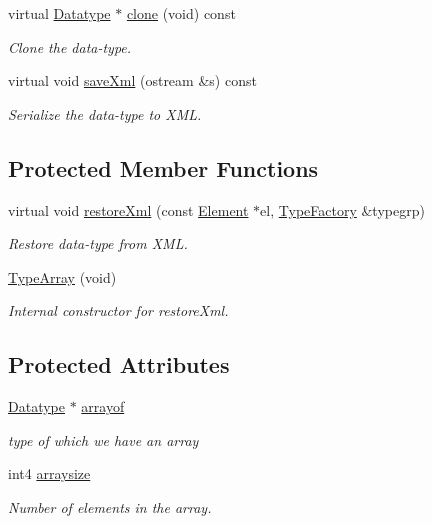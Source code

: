 \begin{DoxyCompactItemize}
virtual \mbox{\hyperlink{class_datatype}{Datatype}} $\ast$ \mbox{\hyperlink{class_type_array_ad08c84ac6e8382fe9f930b4eacb275ce}{clone}} (void) const
\begin{DoxyCompactList}\small\item\em Clone the data-\/type. \end{DoxyCompactList}\item 
virtual void \mbox{\hyperlink{class_type_array_a05c4cd5b16947bdc35e53094099c44bc}{save\+Xml}} (ostream \&s) const
\begin{DoxyCompactList}\small\item\em Serialize the data-\/type to X\+ML. \end{DoxyCompactList}\end{DoxyCompactItemize}
\subsection*{Protected Member Functions}
\begin{DoxyCompactItemize}
\item 
virtual void \mbox{\hyperlink{class_type_array_a3f933b477f4089344f7a58ef67aa6ee1}{restore\+Xml}} (const \mbox{\hyperlink{class_element}{Element}} $\ast$el, \mbox{\hyperlink{class_type_factory}{Type\+Factory}} \&typegrp)
\begin{DoxyCompactList}\small\item\em Restore data-\/type from X\+ML. \end{DoxyCompactList}\item 
\mbox{\hyperlink{class_type_array_aac83422d9146a17dc25463d8b3cd483a}{Type\+Array}} (void)
\begin{DoxyCompactList}\small\item\em Internal constructor for restore\+Xml. \end{DoxyCompactList}\end{DoxyCompactItemize}
\subsection*{Protected Attributes}
\begin{DoxyCompactItemize}
\item 
\mbox{\hyperlink{class_datatype}{Datatype}} $\ast$ \mbox{\hyperlink{class_type_array_a5d03b3f4155f79cd977de5e117302439}{arrayof}}
\begin{DoxyCompactList}\small\item\em type of which we have an array \end{DoxyCompactList}\item 
int4 \mbox{\hyperlink{class_type_array_aada27931106709a3cdc4d247ed84a713}{arraysize}}
\begin{DoxyCompactList}\small\item\em Number of elements in the array. \end{DoxyCompactList}\end{DoxyCompactItemize}
